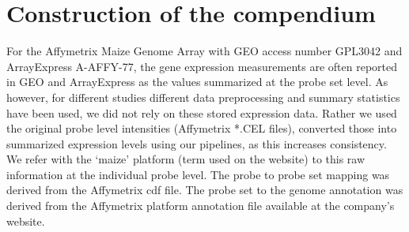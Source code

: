 %		
%	
%	





\section{Construction of the compendium}

For the Affymetrix Maize Genome Array with GEO access number
GPL3042 and ArrayExpress A-AFFY-77, the gene expression
measurements are often reported in GEO and ArrayExpress as the
values summarized at the probe set level.  As however, for
different studies different data preprocessing and summary
statistics have been used, we did not rely on these stored
expression data. Rather we used the original probe level
intensities (Affymetrix *.CEL files), converted those into
summarized expression levels using our pipelines, as this
increases consistency. We refer with the ‘maize’ platform (term
used on the website) to this raw information at the individual
probe level.  The probe to probe set mapping was derived from the
Affymetrix cdf file. The probe set to the genome annotation was
derived from the Affymetrix platform annotation file available at
the company’s website.

